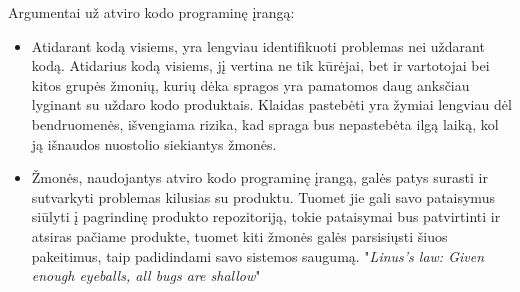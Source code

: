 \documentclass[a4paper,12pt,fleqn]{article}
\begin{document}
Argumentai už atviro kodo programinę įrangą:
\begin{itemize}
	\item Atidarant kodą visiems, yra lengviau identifikuoti problemas nei uždarant kodą. Atidarius kodą visiems, jį vertina ne tik kūrėjai, bet ir vartotojai bei kitos grupės žmonių, kurių dėka spragos yra pamatomos daug anksčiau lyginant su uždaro kodo produktais. Klaidas pastebėti yra žymiai lengviau dėl bendruomenės, išvengiama rizika, kad spraga bus nepastebėta ilgą laiką, kol ją išnaudos nuostolio siekiantys žmonės\cite{10.5555/580808}.
	\item Žmonės, naudojantys atviro kodo programinę įrangą, galės patys surasti ir sutvarkyti problemas kilusias su produktu. Tuomet jie gali savo pataisymus siūlyti į pagrindinę produkto repozitoriją, tokie pataisymai bus patvirtinti ir atsiras pačiame produkte, tuomet kiti žmonės galės parsisiųsti šiuos pakeitimus, taip padidindami savo sistemos saugumą. "\textit{Linus's law: Given enough eyeballs, all bugs are shallow}\cite{Meneely:2009:SOS:1653662.1653717}"
\end{itemize}
\end{document}

